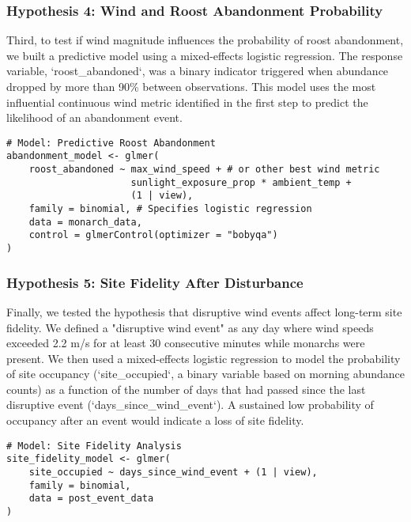 \subsubsection{Hypothesis 4: Wind and Roost Abandonment Probability}

Third, to test if wind magnitude influences the probability of roost abandonment, we built a predictive model using a mixed-effects logistic regression. The response variable, `roost_abandoned`, was a binary indicator triggered when abundance dropped by more than 90\% between observations. This model uses the most influential continuous wind metric identified in the first step to predict the likelihood of an abandonment event.

\begin{verbatim}
# Model: Predictive Roost Abandonment
abandonment_model <- glmer(
    roost_abandoned ~ max_wind_speed + # or other best wind metric
                      sunlight_exposure_prop * ambient_temp +
                      (1 | view),
    family = binomial, # Specifies logistic regression
    data = monarch_data,
    control = glmerControl(optimizer = "bobyqa")
)
\end{verbatim}

\subsubsection{Hypothesis 5: Site Fidelity After Disturbance}

Finally, we tested the hypothesis that disruptive wind events affect long-term site fidelity. We defined a "disruptive wind event" as any day where wind speeds exceeded 2.2 m/s for at least 30 consecutive minutes while monarchs were present. We then used a mixed-effects logistic regression to model the probability of site occupancy (`site_occupied`, a binary variable based on morning abundance counts) as a function of the number of days that had passed since the last disruptive event (`days_since_wind_event`). A sustained low probability of occupancy after an event would indicate a loss of site fidelity.

\begin{verbatim}
# Model: Site Fidelity Analysis
site_fidelity_model <- glmer(
    site_occupied ~ days_since_wind_event + (1 | view),
    family = binomial,
    data = post_event_data
)
\end{verbatim}
